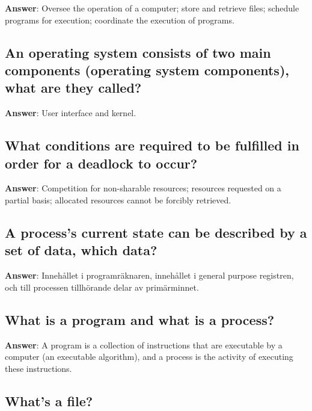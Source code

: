 \documentclass[a4paper,11pt,oneside]{article}
\begin{document}
\begin{sloppypar}
\textbf{Answer}: Oversee the operation of a computer; store and retrieve files; schedule programs for execution; coordinate the execution of programs.



\subsection{An operating system consists of two main components (operating system components), what are they called?}

\label{q:118:sa:en:True}

\textbf{Answer}: User interface and kernel.



\subsection{What conditions are required to be fulfilled in order for a deadlock to occur?}

\label{q:119:sa:en:True}

\textbf{Answer}: Competition for non-sharable resources; resources requested on a partial basis; allocated resources cannot be forcibly retrieved.



\subsection{A process's current state can be described by a set of data, which data?}

\label{q:120:sa:en:True}

\textbf{Answer}: Inneh\r{a}llet i programr\"aknaren, inneh\r{a}llet i general purpose registren, och till processen tillh\"orande delar av prim\"arminnet.



\subsection{What is a program and what is a process?}

\label{q:121:sa:en:True}

\textbf{Answer}: A program is a collection of instructions that are executable by a computer (an executable algorithm), and a process is the activity of executing these instructions.



\subsection{What's a file?}


\end{sloppypar}
\end{document}
